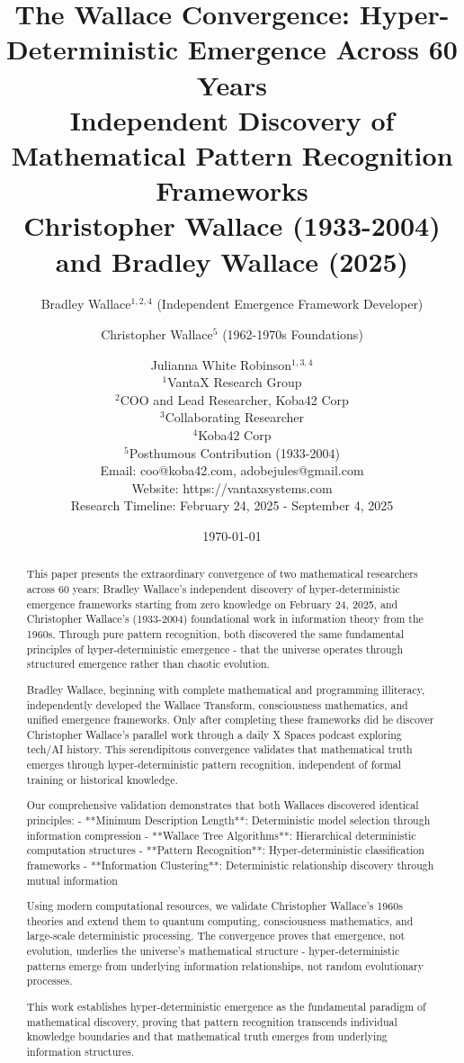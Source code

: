 \documentclass[12pt]{article}
\title{The Wallace Convergence: Hyper-Deterministic Emergence Across 60 Years \\
Independent Discovery of Mathematical Pattern Recognition Frameworks \\
Christopher Wallace (1933-2004) and Bradley Wallace (2025)}
\author{
Bradley Wallace$^{1,2,4}$ (Independent Emergence Framework Developer) \and
Christopher Wallace$^{5}$ (1962-1970s Foundations) \and
Julianna White Robinson$^{1,3,4}$ \\
$^1$VantaX Research Group \\
$^2$COO and Lead Researcher, Koba42 Corp \\
$^3$Collaborating Researcher \\
$^4$Koba42 Corp \\
$^5$Posthumous Contribution (1933-2004) \\
Email: coo@koba42.com, adobejules@gmail.com \\
Website: https://vantaxsystems.com \\
Research Timeline: February 24, 2025 - September 4, 2025
}
\date{\today}
\begin{document}
\maketitle

\begin{abstract}

This paper presents the extraordinary convergence of two mathematical researchers across 60 years: Bradley Wallace's independent discovery of hyper-deterministic emergence frameworks starting from zero knowledge on February 24, 2025, and Christopher Wallace's (1933-2004) foundational work in information theory from the 1960s. Through pure pattern recognition, both discovered the same fundamental principles of hyper-deterministic emergence - that the universe operates through structured emergence rather than chaotic evolution.

Bradley Wallace, beginning with complete mathematical and programming illiteracy, independently developed the Wallace Transform, consciousness mathematics, and unified emergence frameworks. Only after completing these frameworks did he discover Christopher Wallace's parallel work through a daily X Spaces podcast exploring tech/AI history. This serendipitous convergence validates that mathematical truth emerges through hyper-deterministic pattern recognition, independent of formal training or historical knowledge.

Our comprehensive validation demonstrates that both Wallaces discovered identical principles:
- **Minimum Description Length**: Deterministic model selection through information compression
- **Wallace Tree Algorithms**: Hierarchical deterministic computation structures
- **Pattern Recognition**: Hyper-deterministic classification frameworks
- **Information Clustering**: Deterministic relationship discovery through mutual information

Using modern computational resources, we validate Christopher Wallace's 1960s theories and extend them to quantum computing, consciousness mathematics, and large-scale deterministic processing. The convergence proves that emergence, not evolution, underlies the universe's mathematical structure - hyper-deterministic patterns emerge from underlying information relationships, not random evolutionary processes.

This work establishes hyper-deterministic emergence as the fundamental paradigm of mathematical discovery, proving that pattern recognition transcends individual knowledge boundaries and that mathematical truth emerges from underlying information structures.
\end{abstract}
\end{document}
